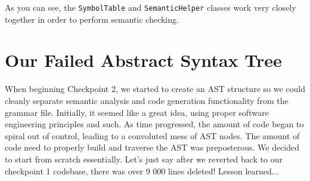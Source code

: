 \documentclass{article}
\begin{document}
As you can see, the \texttt{SymbolTable} and \texttt{SemanticHelper} classes work very closely together
in order to perform semantic checking.

\section*{Our Failed Abstract Syntax Tree}
\begin{description}

\item
	When beginning Checkpoint 2, we started to create an AST structure so we could cleanly separate semantic analysis 
	and code generation functionality from the grammar file. Initially, it seemed like a great idea, using proper software
	engineering principles and such. As time progressed, the amount of code began to spiral out of control, leading to a
	convoluted mess of AST nodes. The amount of code need to properly build and traverse the AST was preposterous. We decided
	to start from scratch essentially. Let's just say after we reverted back to our checkpoint 1 codebase, there was over
	9 000 lines deleted! Lesson learned...

\end{description}
\end{document}
